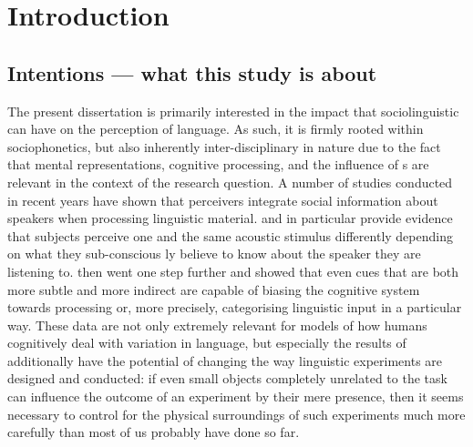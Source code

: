 \chapter{Introduction}
\label{ch.intro}

\section{Intentions --- what this study is about}
\label{sec.intro.intent}

The present dissertation is primarily interested in the impact that sociolinguistic  can have on the perception of language.
As such, it is firmly rooted within sociophonetics, but also inherently inter-disciplinary in nature due to the fact that mental representations, cognitive processing, and the influence of s are relevant in the context of the research question.
A number of studies conducted in recent years have shown that perceivers integrate social information about speakers when processing linguistic material.
\textcite{niedzielski1999} and \textcite{hayetal2006a} in particular provide evidence that subjects perceive one and the same acoustic stimulus differently depending on what they sub-conscious ly believe to know about the speaker they are listening to.
\textcite{haydrager2010} then went one step further and showed that even cues that are both more subtle and more indirect are capable of biasing the cognitive system towards processing or, more precisely, categorising linguistic input in a particular way.
These data are not only extremely relevant for models of how humans cognitively deal with variation in language, but especially the results of \textcite{haydrager2010} additionally have the potential of changing the way linguistic experiments are designed and conducted: if even small objects completely unrelated to the task can influence the outcome of an experiment by their mere presence, then it seems necessary to control for the physical surroundings of such experiments much more carefully than most of us probably have done so far.

